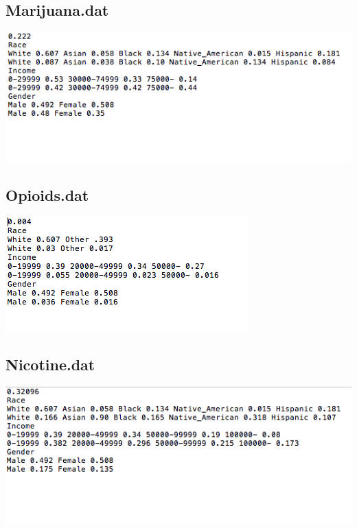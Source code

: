 \documentclass{article}
\begin{document}
\subsection{Marijuana.dat}
\includegraphics{mar.png}
\subsection{Opioids.dat}
\includegraphics{opi.png}
\subsection{Nicotine.dat}
\includegraphics{nico.png}
\end{document}
